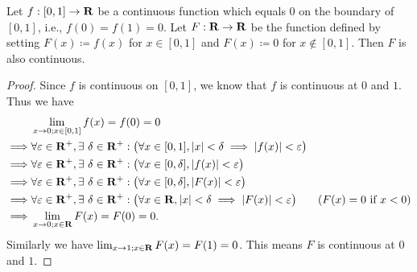 \begin{lemma}\label{3.8.16}
  Let \(f : [0, 1] \to \mathbf{R}\) be a continuous function which equals \(0\) on the boundary of \([0, 1]\), i.e., \(f(0) = f(1) = 0\).
  Let \(F : \mathbf{R} \to \mathbf{R}\) be the function defined by setting \(F(x) \coloneqq f(x)\) for \(x \in [0, 1]\) and \(F(x) \coloneqq 0\) for \(x \notin [0, 1]\).
  Then \(F\) is also continuous.
\end{lemma}

\begin{proof}
  Since \(f\) is continuous on \([0, 1]\), we know that \(f\) is continuous at \(0\) and \(1\).
  Thus we have
  \begin{align*}
             & \lim_{x \to 0 ; x \in [0, 1]} f(x) = f(0) = 0                                                                                                                              \\
    \implies & \forall \varepsilon \in \mathbf{R}^+, \exists\ \delta \in \mathbf{R}^+ : \big(\forall x \in [0, 1], \left\lvert x\right\rvert < \delta \implies \left\lvert f(x)\right\rvert < \varepsilon\big)                                \\
    \implies & \forall \varepsilon \in \mathbf{R}^+, \exists\ \delta \in \mathbf{R}^+ : \big(\forall x \in [0, \delta], \left\lvert f(x)\right\rvert < \varepsilon\big)                                                     \\
    \implies & \forall \varepsilon \in \mathbf{R}^+, \exists\ \delta \in \mathbf{R}^+ : \big(\forall x \in [0, \delta], \left\lvert F(x)\right\rvert < \varepsilon\big)                                                     \\
    \implies & \forall \varepsilon \in \mathbf{R}^+, \exists\ \delta \in \mathbf{R}^+ : \big(\forall x \in \mathbf{R}, \left\lvert x\right\rvert < \delta \implies \left\lvert F(x)\right\rvert < \varepsilon\big)     & (F(x) = 0 \text{ if } x < 0) \\
    \implies & \lim_{x \to 0 ; x \in \mathbf{R}} F(x) = F(0) = 0.
  \end{align*}
  Similarly we have \(\lim_{x \to 1 ; x \in \mathbf{R}} F(x) = F(1) = 0\).
  This means \(F\) is continuous at \(0\) and \(1\).


\end{proof}
